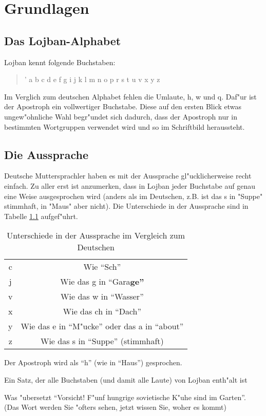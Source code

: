 \chapter{Grundlagen}
\section{Das Lojban-Alphabet}
Lojban kennt folgende Buchstaben:
\begin{quote}
' a b c d e f g i j k l m n o p r s t u v x y z
\end{quote}
Im Verglich zum deutschen Alphabet fehlen die Umlaute, h, w und q. Daf"ur ist der Apostroph ein vollwertiger Buchstabe. Diese
auf den ersten Blick etwas ungew"ohnliche Wahl begr"undet sich dadurch, dass der Apostroph nur in bestimmten Wortgruppen verwendet wird
und so im Schriftbild heraussteht.

\section{Die Aussprache}
Deutsche Muttersprachler haben es mit der Aussprache gl"ucklicherweise recht einfach. Zu aller erst ist anzumerken, dass in Lojban jeder Buchstabe auf genau eine Weise ausgesprochen wird (anders als im Deutschen, z.B. ist das s in "Suppe" stimmhaft, in "Maus" aber nicht).
Die Unterschiede in der Aussprache sind in Tabelle \ref{tbl:aussprache} aufgef"uhrt.
\begin{table}
\centering
\begin{tabular}{|c|c|}
\hline
c & Wie ``Sch'' \\
j & Wie das g in ``Gara\bf{g}e'' \\ %
v & Wie das w in ``Wasser''\\
x & Wie das ch in ``Dach'' \\
y & Wie das e in ``M"ucke'' oder das a in ``about'' \\
z & Wie das s in ``Suppe'' (stimmhaft) \\
\hline
\end{tabular}
\caption{Unterschiede in der Aussprache im Vergleich zum Deutschen}
\label{tbl:aussprache}
\end{table}
Der Apostroph wird als ``h'' (wie in ``Haus'') gesprochen.

Ein Satz, der alle Buchstaben (und damit alle Laute) von Lojban enth"alt ist
\begin{quote}
\end{quote}
Was "ubersetzt ``Vorsicht! F"unf hungrige sovietische K"uhe sind im Garten''. (Das Wort  werden Sie "ofters sehen, jetzt wissen
Sie, woher es kommt)

